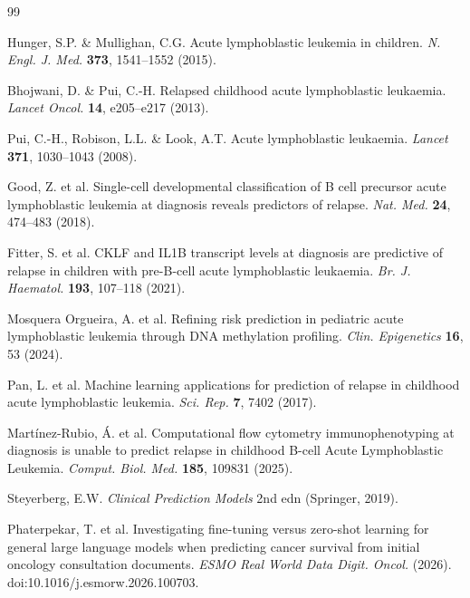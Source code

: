 \documentclass[pdflatex,sn-nature]{sn-jnl}
\begin{document}
\begin{thebibliography}{99}

Hunger, S.P. \& Mullighan, C.G.
Acute lymphoblastic leukemia in children.
\textit{N. Engl. J. Med.} \textbf{373}, 1541--1552 (2015).

Bhojwani, D. \& Pui, C.-H.
Relapsed childhood acute lymphoblastic leukaemia.
\textit{Lancet Oncol.} \textbf{14}, e205--e217 (2013).

Pui, C.-H., Robison, L.L. \& Look, A.T.
Acute lymphoblastic leukaemia.
\textit{Lancet} \textbf{371}, 1030--1043 (2008).

Good, Z. et al.
Single-cell developmental classification of B cell precursor acute
lymphoblastic leukemia at diagnosis reveals predictors of relapse.
\textit{Nat. Med.} \textbf{24}, 474--483 (2018).

Fitter, S. et al.
CKLF and IL1B transcript levels at diagnosis are predictive of
relapse in children with pre-B-cell acute lymphoblastic leukaemia.
\textit{Br. J. Haematol.} \textbf{193}, 107--118 (2021).

Mosquera Orgueira, A. et al.
Refining risk prediction in pediatric acute lymphoblastic leukemia
through DNA methylation profiling.
\textit{Clin. Epigenetics} \textbf{16}, 53 (2024).

Pan, L. et al.
Machine learning applications for prediction of relapse in childhood
acute lymphoblastic leukemia.
\textit{Sci. Rep.} \textbf{7}, 7402 (2017).

Mart\'inez-Rubio, \'{A}. et al.
Computational flow cytometry immunophenotyping at diagnosis is unable
to predict relapse in childhood B-cell Acute Lymphoblastic Leukemia.
\textit{Comput. Biol. Med.} \textbf{185}, 109831 (2025).

Steyerberg, E.W.
\textit{Clinical Prediction Models} 2nd edn (Springer, 2019).

Phaterpekar, T. et al.
Investigating fine-tuning versus zero-shot learning for general large
language models when predicting cancer survival from initial oncology
consultation documents.
\textit{ESMO Real World Data Digit. Oncol.} (2026).
doi:10.1016/j.esmorw.2026.100703.


\end{thebibliography}
\end{document}

